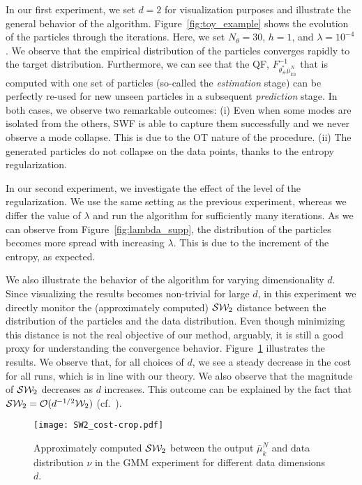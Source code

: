In our first experiment, we set $d=2$ for visualization purposes and illustrate the general behavior of the algorithm. Figure~\ref{fig:toy_example} shows the evolution of the particles through the iterations. Here, we set $N_\theta=30$, $h=1$, and $\lambda=10^{-4}$.
%
We observe that the empirical distribution of the particles converges rapidly to the target distribution. Furthermore, we can see that the QF, $F^{-1}_{\theta^*_\#\bar{\mu}_{kh}^{N}}$ that is computed with one set of particles (so-called the \textit{estimation} stage) can be perfectly re-used for new unseen particles in a subsequent \textit{prediction} stage. In both cases, we observe two remarkable outcomes: (i) Even when some modes are isolated from the others, SWF is able to capture them successfully and we never observe a mode collapse. This is due to the OT nature of the procedure. (ii) The generated particles do not collapse on the data points, thanks to the entropy regularization.

In our second experiment, we investigate the effect of the level of the regularization. We use the same setting as the previous experiment, whereas we differ the value of $\lambda$ and run the algorithm for sufficiently many iterations. As we can observe from Figure~\ref{fig:lambda_supp}, the distribution of the particles becomes more spread with increasing $\lambda$. This is due to the increment of the entropy, as expected.



We also illustrate the behavior of the algorithm for varying dimensionality $d$. Since visualizing the results becomes non-trivial for large $d$, in this experiment we directly monitor the (approximately computed) ${\cal S}{\cal W}_2$ distance between the distribution of the particles and the data distribution. Even though minimizing this distance is not the real objective of our method, arguably, it is still a good proxy for understanding the convergence behavior.
%
Figure~\ref{fig:toy_sw} illustrates the results. We observe that, for all choices of $d$, we see a steady decrease in the cost for all runs, which is in line with our theory. We also observe that the magnitude of ${\cal S}{\cal W}_2$ decreases as $d$ increases. This outcome can be explained by the fact that ${\cal S}{\cal W}_2 = {\cal O}(d^{-1/2}{\cal W}_2)$ (cf.\ \cite{bonnotte2013unidimensional}).




\begin{figure}
\begin{centering}
\texttt{[image: SW2\_cost-crop.pdf]}
\par\end{centering}
\caption{Approximately computed ${\cal S}{\cal W}_2$ between the output $\bar{\mu}_{k}^{N}$ and data distribution $\nu$ in the GMM experiment for different data dimensions $d$.
\label{fig:toy_sw}}
\end{figure}


